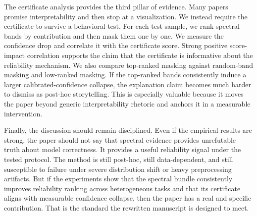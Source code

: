 \documentclass{article}
\begin{document}
The certificate analysis provides the third pillar of evidence. Many papers promise interpretability and then stop at a visualization. We instead require the certificate to survive a behavioral test. For each test sample, we rank spectral bands by contribution and then mask them one by one. We measure the confidence drop and correlate it with the certificate score. Strong positive score-impact correlation supports the claim that the certificate is informative about the reliability mechanism. We also compare top-ranked masking against random-band masking and low-ranked masking. If the top-ranked bands consistently induce a larger calibrated-confidence collapse, the explanation claim becomes much harder to dismiss as post-hoc storytelling. This is especially valuable because it moves the paper beyond generic interpretability rhetoric and anchors it in a measurable intervention.

Finally, the discussion should remain disciplined. Even if the empirical results are strong, the paper should not say that spectral evidence provides unrefutable truth about model correctness. It provides a useful reliability signal under the tested protocol. The method is still post-hoc, still data-dependent, and still susceptible to failure under severe distribution shift or heavy preprocessing artifacts. But if the experiments show that the spectral bundle consistently improves reliability ranking across heterogeneous tasks and that its certificate aligns with measurable confidence collapse, then the paper has a real and specific contribution. That is the standard the rewritten manuscript is designed to meet.
\end{document}
